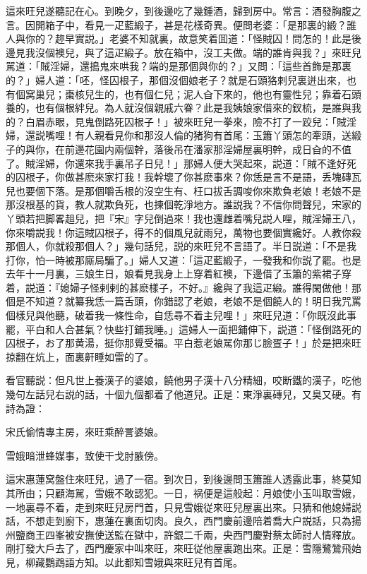 這來旺兒遂聽記在心。到晚夕，到後邊吃了幾鍾酒，歸到房中。常言：酒發胸腹之言。因開箱子中，看見一疋藍緞子，甚是花樣奇異。便問老婆：「是那裏的緞？誰人與你的？趂早實説。」老婆不知就裏，故意笑着囬道：「怪賊囚！問怎的！此是後邊見我沒個襖兒，與了這疋緞子。放在箱中，沒工夫做。端的誰肯與我？」來旺兒駡道：「賊淫婦，還搗鬼來哄我？端的是那個與你的？」又問：「這些首飾是那裏的？」婦人道：「呸，怪囚根子，那個沒個娘老子？就是石頭狢剌兒裏迸出來，也有個窝巢兒；棗核兒生的，也有個仁兒；泥人㒲下來的，他也有靈性兒；靠着石頭養的，也有個根絆兒。為人就沒個親戚六眷？此是我姨娘家借來的釵梳，是誰與我的？白眉赤眼，見鬼倒路死囚根子！」被來旺兒一拳來，險不打了一跤兒：「賊淫婦，還説嘴哩！有人親看見你和那沒人倫的猪狗有首尾：玉簫丫頭怎的牽頭，送緞子的與你，在前邊花園内兩個幹，落後吊在潘家那淫婦屋裏明幹，成日㒲的不值了。賊淫婦，你還來我手裏吊子日兒！」那婦人便大哭起來，説道：「賊不逢好死的囚根子，你做甚麽來家打我！我幹壞了你甚麽事來？你恁是言不是語，丢塊磚瓦兒也要個下落。是那個嚼舌根的沒空生有、枉口拔舌調唆你來欺負老娘！老娘不是那沒根基的貨，教人就欺負死，也揀個乾淨地方。誰説我？不信你問聲兒，宋家的丫頭若把脚畧趄兒，把『宋』字兒倒過來！我也還雌着嘴兒説人哩，賊淫婦王八，你來嚼説我！你這賊囚根子，得不的個風兒就雨兒，萬物也要個實纔好。人教你殺那個人，你就殺那個人？」幾句話兒，説的來旺兒不言語了。半日説道：「不是我打你，怕一時被那廝局騙了。」婦人又道：「這疋藍緞子，一發我和你説了罷。也是去年十一月裏，三娘生日，娘看見我身上上穿着紅襖，下邊借了玉簫的紫裙子穿着，説道：『媳婦子怪剌剌的甚麽樣子，不好。』纔與了我這疋緞。誰得閑做他！那個是不知道？就纂我恁一篇舌頭，你錯認了老娘，老娘不是個饒人的！明日我咒罵個樣兒與他聽，破着我一條性命，自恁尋不着主兒哩！」來旺兒道：「你既沒此事罷，平白和人合甚氣？快些打鋪我睡。」這婦人一面把鋪伸下，説道：「怪倒路死的囚根子，お了那黄湯，挺你那覺受福。平白惹老娘駡你那じ臉疍子！」於是把來旺掠翻在炕上，面裏鼾睡如雷的了。

看官聽説：但凡世上養漢子的婆娘，饒他男子漢十八分精細，咬断鐵的漢子，吃他幾句左話兒右説的話，十個九個都着了他道兒。正是：東淨裏磚兒，又臭又硬。有詩為證：

宋氏偷情專主房，來旺乘醉詈婆娘。

雪娥暗泄蜂媒事，致使干戈肘腋傍。

這宋惠蓮窝盤住來旺兒，過了一宿。到次日，到後邊問玉簫誰人透露此事，終莫知其所由；只顧海駡，雪娥不敢認犯。一日，祸便是這般起：月娘使小玉叫取雪娥，一地裏尋不着，走到來旺兒房門首，只見雪娥従來旺兒屋裏出來。只猜和他媳婦説話，不想走到廚下，惠蓮在裏面切肉。良久，西門慶前邊陪着喬大户説話，只為揚州鹽商王四峯被安撫使送監在獄中，許銀二千兩，央西門慶對蔡太師討人情釋放。剛打發大戶去了，西門慶家中叫來旺，來旺従他屋裏跑出來。正是：雪隱鷺鷥飛始見，柳藏鸚鵡語方知。以此都知雪娥與來旺兒有首尾。

